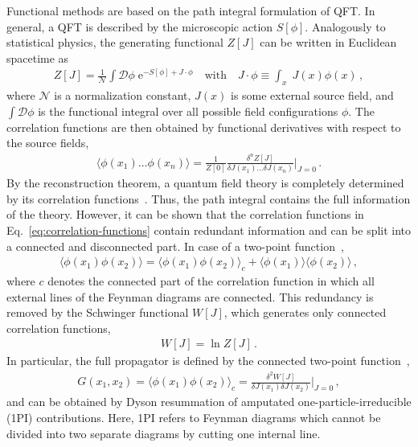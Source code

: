 Functional methods are based on the path integral formulation of QFT. In general, a QFT is described by the microscopic action $S[\phi]$. Analogously to statistical physics, the generating functional $Z[J]$ can be written in Euclidean spacetime as
%
\begin{align}
	\label{eq:generating-functional}
	Z[J] = \frac{1}{\mathcal{N}} \int \mathcal{D}\phi\; \mathrm{e}^{-S[\phi]+J\cdot\phi} \quad \mathrm{with} \quad J\cdot\phi\equiv\int_x\;J(x)\phi(x)\,,
\end{align}
%
where $\mathcal{N}$ is a normalization constant, $J(x)$ is some external source field, and $\int\mathcal{D}\phi$ is the functional integral over all possible field configurations $\phi$. The correlation functions are then obtained by functional derivatives with respect to the source fields,
%
\begin{align}
	\label{eq:correlation-functions}
	\langle \phi(x_1)\dots\phi(x_n)\rangle = \frac{1}{Z[0]}\frac{\delta^n Z[J]}{\delta J(x_1)\dots\delta J(x_n)} \Bigg|_{J=0} \,.
\end{align} 
%
By the reconstruction theorem, a quantum field theory is completely determined by its correlation functions~\cite{Wightman1956}. Thus, the path integral contains the full information of the theory. 
However, it can be shown that the correlation functions in Eq.~\eqref{eq:correlation-functions} contain redundant information and can be split into a connected and disconnected part. In case of a two-point function~\cite{Peskin1995},
%
\begin{align}
	\label{eq:two-point-function}
	\langle \phi(x_1)\phi(x_2)\rangle = \langle \phi(x_1)\phi(x_2)\rangle_c + \langle\phi(x_1)\rangle\langle\phi(x_2)\rangle \,,
\end{align}
%
where $c$ denotes the connected part of the correlation function in which all external lines of the Feynman diagrams are connected. This redundancy is removed by the Schwinger functional $W[J]$, which generates only connected correlation functions,
%
\begin{align}
	\label{eq:schwinger-functional}
	W[J] = \ln Z[J] \,.
\end{align}
%
In particular, the full propagator is defined by the connected two-point function~\cite{Peskin1995},
%
\begin{align}
	\label{eq:propagator-schwinger}
	G(x_1,x_2) = \langle \phi(x_1)\phi(x_2)\rangle_c = \frac{\delta^2 W[J]}{\delta J(x_1)\delta J(x_2)} \Bigg|_{J=0} \,,
\end{align}
%
and can be obtained by Dyson resummation of amputated one-particle-irreducible (1PI) contributions. Here, 1PI refers to Feynman diagrams which cannot be divided into two separate diagrams by cutting one internal line. 

